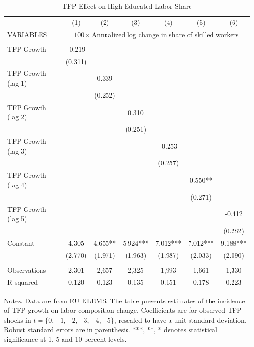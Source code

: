 \documentclass[12pt]{article}
\begin{document}
\begin{appendices}
\begin{table}[h!]
\begin{center}
\scriptsize
\begin{tabular}{lcccccc} \hline \hline
 & (1) & (2) & (3) & (4) & (5) & (6)\\
VARIABLES & \multicolumn{6}{c}{$100 \times$Annualized log change in share of skilled workers} \\ \hline
 &  &  &  &  &  &  \\
TFP Growth & -0.219 &  &  &  &  &  \\
 & (0.311) &  &  &  &  &  \\
TFP Growth (lag 1) &  & 0.339 &  &  &  &  \\
 &  & (0.252) &  &  &  &  \\
TFP Growth (lag 2) &  &  & 0.310 &  &  &  \\
 &  &  & (0.251) &  &  &  \\
TFP Growth (lag 3) &  &  &  & -0.253 &  &  \\
 &  &  &  & (0.257) &  &  \\
TFP Growth (lag 4) &  &  &  &  & 0.550** &  \\
 &  &  &  &  & (0.271) &  \\
TFP Growth (lag 5) &  &  &  &  &  & -0.412 \\
 &  &  &  &  &  & (0.282) \\
Constant & 4.305 & 4.655** & 5.924*** & 7.012*** & 7.012*** & 9.188*** \\
 & (2.770) & (1.971) & (1.963) & (1.987) & (2.033) & (2.090) \\
 &  &  &  &  &  &  \\
Observations & 2,301 & 2,657 & 2,325 & 1,993 & 1,661 & 1,330 \\
 R-squared & 0.120 & 0.123 & 0.135 & 0.151 & 0.178 & 0.223 \\ \hline
\end{tabular}
\end{center}
\caption{TFP Effect on High Educated Labor Share}
\label{estimation1}
{\scriptsize Notes: Data are from EU KLEMS. The table presents estimates of the incidence of TFP growth on labor composition change. Coefficients are for observed TFP shocks in $t = \{0,-1,-2,-3,-4,-5\}$, rescaled to have a unit standard deviation. Robust standard errors are in parenthesis. ***, **, * denotes statistical significance at 1, 5 and 10 percent levels.}
\end{table}


\end{appendices}
\end{document}
